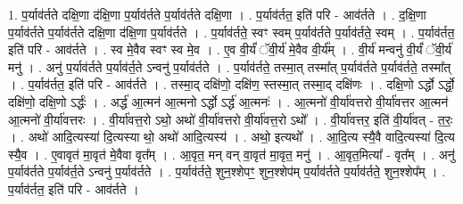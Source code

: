 \documentclass[17pt]{extarticle}
\begin{document}
1. प॒र्याव॑र्तते दक्षि॒णा द॑क्षि॒णा प॒र्याव॑र्तते प॒र्याव॑र्तते दक्षि॒णा । . प॒र्याव॑र्तत॒ इति॑ परि - आव॑र्तते । . द॒क्षि॒णा प॒र्याव॑र्तते प॒र्याव॑र्तते दक्षि॒णा द॑क्षि॒णा प॒र्याव॑र्तते । . प॒र्याव॑र्तते॒ स्वꣳ स्वम् प॒र्याव॑र्तते प॒र्याव॑र्तते॒ स्वम् । . प॒र्याव॑र्तत॒ इति॑ परि - आव॑र्तते । . स्व मे॒वैव स्वꣳ स्व मे॒व । . ए॒व वी॒र्यं॑ ॅवी॒र्य॑ मे॒वैव वी॒र्य᳚म् । . वी॒र्य॑ मन्वनु॑ वी॒र्यं॑ ॅवी॒र्य॑ मनु॑ । . अनु॑ प॒र्याव॑र्तते प॒र्याव॑र्त॒ते ऽन्वनु॑ प॒र्याव॑र्तते । . प॒र्याव॑र्तते॒ तस्मा॒त् तस्मा᳚त् प॒र्याव॑र्तते प॒र्याव॑र्तते॒ तस्मा᳚त् । . प॒र्याव॑र्तत॒ इति॑ परि - आव॑र्तते । . तस्मा॒द् दक्षि॑णो॒ दक्षि॑ण॒ स्तस्मा॒त् तस्मा॒द् दक्षि॑णः । . दक्षि॒णो ऽर्द्धो ऽर्द्धो॒ दक्षि॑णो॒ दक्षि॒णो ऽर्द्धः॑ । . अर्द्ध॑ आ॒त्मन॑ आ॒त्मनो ऽर्द्धो ऽर्द्ध॑ आ॒त्मनः॑ । . आ॒त्मनो॑ वी॒र्या॑वत्तरो वी॒र्या॑वत्तर आ॒त्मन॑ आ॒त्मनो॑ वी॒र्या॑वत्तरः । . वी॒र्या॑वत्त॒रो ऽथो॒ अथो॑ वी॒र्या॑वत्तरो वी॒र्या॑वत्त॒रो ऽथो᳚ । . वी॒र्या॑वत्तर॒ इति॑ वी॒र्या॑वत् - त॒रः॒ । . अथो॑ आदि॒त्यस्या॑ दि॒त्यस्या थो॒ अथो॑ आदि॒त्यस्य॑ । . अथो॒ इत्यथो᳚ । . आ॒दि॒त्य स्यै॒वै वादि॒त्यस्या॑ दि॒त्य स्यै॒व । . ए॒वावृत॑ मा॒वृत॑ मे॒वैवा वृत᳚म् । . आ॒वृत॒ मन् वन् वा॒वृत॑ मा॒वृत॒ मनु॑ । . आ॒वृत॒मित्या᳚ - वृत᳚म् । . अनु॑ प॒र्याव॑र्तते प॒र्याव॑र्त॒ते ऽन्वनु॑ प॒र्याव॑र्तते । . प॒र्याव॑र्तते॒ शुन॒श्शेपꣳ॒॒ शुन॒श्शेप॑म् प॒र्याव॑र्तते प॒र्याव॑र्तते॒ शुन॒श्शेप᳚म् । . प॒र्याव॑र्तत॒ इति॑ परि - आव॑र्तते । \newline
\end{document}
